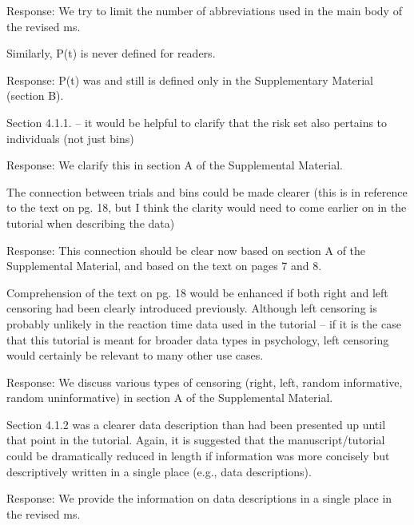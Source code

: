 \documentclass[
]{article}
\renewenvironment{quote}{\begin{leftbar}}{\end{leftbar}}
\begin{document}
Response: We try to limit the number of abbreviations used in the main
body of the revised ms.

\begin{quote}
Similarly, P(t) is never defined for readers.
\end{quote}

Response: P(t) was and still is defined only in the Supplementary
Material (section B).

\begin{quote}
Section 4.1.1. -- it would be helpful to clarify that the risk set also
pertains to individuals (not just bins)
\end{quote}

Response: We clarify this in section A of the Supplemental Material.

\begin{quote}
The connection between trials and bins could be made clearer (this is in
reference to the text on pg. 18, but I think the clarity would need to
come earlier on in the tutorial when describing the data)
\end{quote}

Response: This connection should be clear now based on section A of the
Supplemental Material, and based on the text on pages 7 and 8.

\begin{quote}
Comprehension of the text on pg. 18 would be enhanced if both right and
left censoring had been clearly introduced previously. Although left
censoring is probably unlikely in the reaction time data used in the
tutorial -- if it is the case that this tutorial is meant for broader
data types in psychology, left censoring would certainly be relevant to
many other use cases.
\end{quote}

Response: We discuss various types of censoring (right, left, random
informative, random uninformative) in section A of the Supplemental
Material.

\begin{quote}
Section 4.1.2 was a clearer data description than had been presented up
until that point in the tutorial. Again, it is suggested that the
manuscript/tutorial could be dramatically reduced in length if
information was more concisely but descriptively written in a single
place (e.g., data descriptions).
\end{quote}

Response: We provide the information on data descriptions in a single
place in the revised ms.
\end{document}
